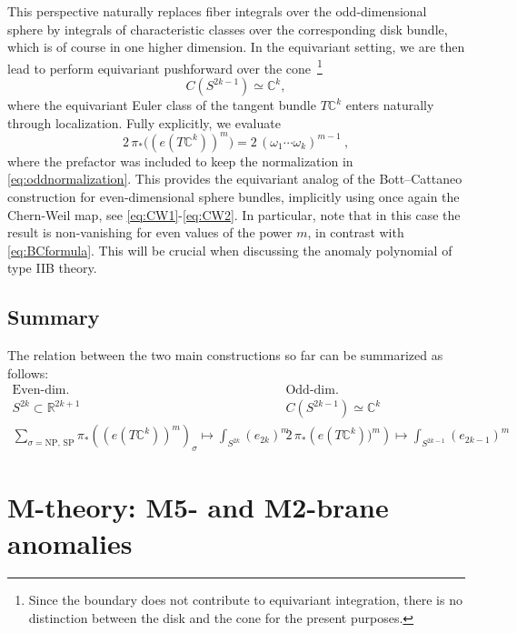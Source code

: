 \documentclass[11pt,a4paper]{article}
\theoremstyle{definition}
\theoremstyle{identity}
\theoremstyle{remark}
\newcommand{\be}{\begin{equation}}
\newcommand{\ee}{\end{equation}}
\newcommand{\BC}{\mathbb{C}}
\begin{document}
This perspective naturally replaces fiber integrals over the odd-dimensional
sphere by integrals of characteristic classes over the corresponding disk
bundle, which is of course in one higher dimension. In the equivariant setting, we are then lead to perform equivariant pushforward over the cone~\footnote{Since the boundary does not contribute to equivariant integration, there is no distinction between the disk and the cone for the present purposes.}
\be
C(S^{2k-1})\simeq \BC^{k},
\ee
where the equivariant Euler class of the tangent bundle
$T\BC^k$ enters naturally through localization. Fully explicitly, we evaluate
\be
\label{eq:CEulerclass}
    2\, \pi_* \Big((e(T\BC^{k}))^m\Big) = 2\, (\omega_1\cdots\omega_k)^{m-1}\ ,
\ee
where the prefactor was included to keep the normalization in \eqref{eq:oddnormalization}.
This provides the
equivariant analog of the Bott--Cattaneo construction for
even-dimensional sphere bundles, implicitly using once again the Chern-Weil map, see \eqref{eq:CW1}-\eqref{eq:CW2}. In particular, note that in this case the result is non-vanishing for even values of the power $m$, in contrast with \eqref{eq:BCformula}. This will be crucial when discussing the anomaly polynomial of type IIB theory.

\subsection*{Summary}
The relation between the two main constructions so far can be summarized as follows:
\begin{equation}
\begin{array}{c|c}
\text{Even-dim.} & \text{Odd-dim.} \\[2mm]
\hline
S^{2k}\subset \mathbb{R}^{2k+1} &
 C(S^{2k-1})\simeq\BC^{k} \\[2mm] \displaystyle
 \sum_{\sigma = \text{NP, SP}} \pi_* \left( (e(T\BC^k))^m \right)_\sigma \mapsto \int_{S^{2k}}\!\left(e_{2k}\right)^m &
\displaystyle 2\, \pi_* \left(e (T\BC^k))^m\right) \mapsto \int_{S^{2k-1}}\!\left(e_{2k-1}\right)^m 
\end{array}
\end{equation}


\section{M-theory: M5- and M2-brane anomalies}
\label{sec:Mtheory}
\end{document}
